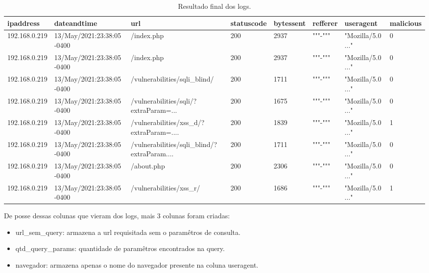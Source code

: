 \begin{table}
\centering

\begin{tabular}{|l|l|l|l|l|l|l|l|}
\hline
    ipaddress & dateandtime & url & statuscode & bytessent & refferer & useragent & malicious \\ \hline
    192.168.0.219 & 13/May/2021:23:38:05 -0400 & /index.php & 200 & 2937 & """-""" & "Mozilla/5.0 ..." & 0 \\ \hline
    192.168.0.219 & 13/May/2021:23:38:05 -0400 & /index.php & 200 & 2937 & """-""" & "Mozilla/5.0 ..." & 0 \\ \hline
    192.168.0.219 & 13/May/2021:23:38:05 -0400 & /vulnerabilities/sqli\_blind/ & 200 & 1711 & """-""" & "Mozilla/5.0 ..." & 0 \\ \hline
    192.168.0.219 & 13/May/2021:23:38:05 -0400 & /vulnerabilities/sqli/?extraParam=... & 200 & 1675 & """-""" & "Mozilla/5.0 ..." & 0 \\ \hline
    192.168.0.219 & 13/May/2021:23:38:05 -0400 & /vulnerabilities/xss\_d/?extraParam=.... & 200 & 1839 & """-""" & "Mozilla/5.0 ..." & 1 \\ \hline
    192.168.0.219 & 13/May/2021:23:38:05 -0400 & /vulnerabilities/sqli\_blind/?extraParam.... & 200 & 1711 & """-""" & "Mozilla/5.0 ..." & 0 \\ \hline
    192.168.0.219 & 13/May/2021:23:38:05 -0400 & /about.php & 200 & 2306 & """-""" & "Mozilla/5.0 ..." & 0 \\ \hline
    192.168.0.219 & 13/May/2021:23:38:05 -0400 & /vulnerabilities/xss\_r/ & 200 & 1686 & """-""" & "Mozilla/5.0 ..." & 1 \\ \hline
\end{tabular}

\caption{Resultado final dos logs.\label{tab:exemplo_log}}

\end{table}

De posse dessas colunas que vieram dos logs, mais 3 colunas foram criadas:

\begin{itemize}
    \item url\_sem\_query: armazena a url requisitada sem o paramêtros de consulta.
    \item qtd\_query\_params: quantidade de paramêtros encontrados na query.
    \item navegador: armazena apenas o nome do navegador presente na coluna useragent.
\end{itemize}


